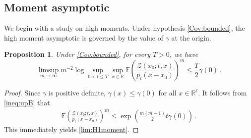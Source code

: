 \documentclass[12pt,reqno]{amsart}
\newtheorem{proposition}[theorem]{Proposition}
\theoremstyle{remark}
\newcommand{\1}{\mathbf{1}}
\def\RR{\mathbb{R}}
\def\EE{\mathbb{E}}
\def\PP{\mathbb{P}}
\def\Z{\mathcal{Z}}
\begin{document}
\subsection*{Moment asymptotic} %
	We begin with a study on high moments. Under hypothesis \ref{Cov:bounded}, the high moment asymptotic is governed by the value of $\gamma$ at the origin.
	\begin{proposition}\label{prop:H1m}
		Under \ref{Cov:bounded}, for every $T>0$, we have 
		\begin{equation}\label{lim:H1moment}
		 \limsup_{m \to \infty} m^{-2} \log\sup_{0<t\le T} \sup_{x\in \RR}  \EE \left(\frac{\Z(x_0;t,x)}{p_t(x-x_0)}\right)^m 
		 \le  \frac{T}{2}\gamma(0)\,.
		\end{equation}
	\end{proposition}
	\begin{proof}
	  Since $\gamma$ is positive definite, $\gamma(x)\leq \gamma(0)$ for all $x \in \RR^{\ell}$. It follows from \eqref{ineq:upB} that 
	  \begin{eqnarray*}
	  \EE \left( \frac{\Z(x_0;t,x)}{p_t(x-x_0)}\right)^m \leq \exp \left( \frac{m(m-1)}{2} t \gamma(0) \right) \,.
	  \end{eqnarray*}
	  This immediately yields \eqref{lim:H1moment}.

\end{proof}
\end{document}
